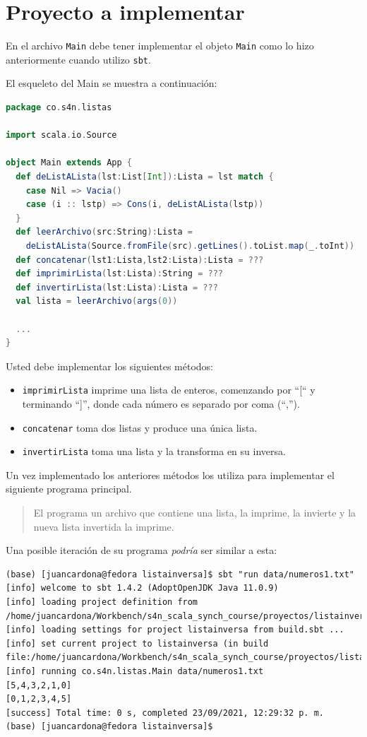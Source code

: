 \documentclass[12pt]{article}
\newcounter{problema}
\begin{document}
\section{Proyecto a implementar}
\label{sec:problema-resolver}

En el archivo \texttt{Main} debe tener implementar el objeto \texttt{Main} como lo hizo anteriormente cuando utilizo \texttt{sbt}.

El esqueleto del Main se muestra a continuación:

\begin{lstlisting}[language=Scala]
package co.s4n.listas

import scala.io.Source

object Main extends App {
  def deListALista(lst:List[Int]):Lista = lst match {
    case Nil => Vacia()
    case (i :: lstp) => Cons(i, deListALista(lstp))
  }
  def leerArchivo(src:String):Lista =
    deListALista(Source.fromFile(src).getLines().toList.map(_.toInt))
  def concatenar(lst1:Lista,lst2:Lista):Lista = ???
  def imprimirLista(lst:Lista):String = ???
  def invertirLista(lst:Lista):Lista = ???
  val lista = leerArchivo(args(0))

  ...
}
\end{lstlisting}

Usted debe implementar los siguientes métodos:
\begin{itemize}
\item \texttt{imprimirLista} imprime una lista de enteros, comenzando por ``[`` y terminando ``]'', donde cada número es separado por coma (``,'').
\item \texttt{concatenar} toma dos listas y produce una única lista.
\item \texttt{invertirLista} toma una lista y la transforma en su inversa.
\end{itemize}

Un vez implementado los anteriores métodos los utiliza para implementar el siguiente programa principal.

\begin{quote}
  El programa un archivo que contiene una lista, la imprime, la invierte y la nueva lista invertida la imprime.
\end{quote}

Una posible iteración de su programa \emph{podría} ser similar a esta:

{\footnotesize
\begin{verbatim}
(base) [juancardona@fedora listainversa]$ sbt "run data/numeros1.txt"
[info] welcome to sbt 1.4.2 (AdoptOpenJDK Java 11.0.9)
[info] loading project definition from /home/juancardona/Workbench/s4n_scala_synch_course/proyectos/listainversa/project
[info] loading settings for project listainversa from build.sbt ...
[info] set current project to listainversa (in build file:/home/juancardona/Workbench/s4n_scala_synch_course/proyectos/listainversa/)
[info] running co.s4n.listas.Main data/numeros1.txt
[5,4,3,2,1,0]
[0,1,2,3,4,5]
[success] Total time: 0 s, completed 23/09/2021, 12:29:32 p. m.
(base) [juancardona@fedora listainversa]$  
\end{verbatim}
}

% 
% 
\end{document}
